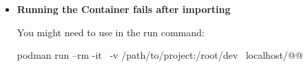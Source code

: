 \begin{itemize}
  \item {\bf Running the Container fails after importing}

    You might need to use  in the run command:
  \begin{monobox}
podman run --rm -it \
  -v /path/to/project:/root/dev \
  localhost/@\imagename{}@
\end{monobox}
\end{itemize}
